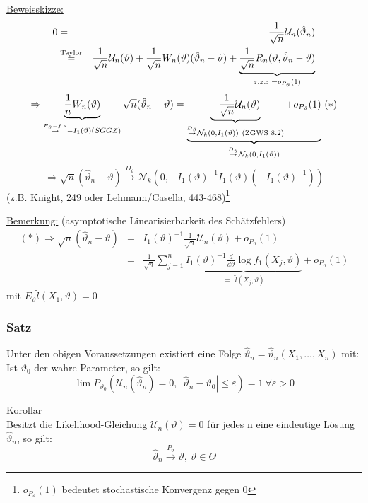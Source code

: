 \documentclass[a4paper,11pt,twoside,titlepage]{article}
\newcommand\NN{ \mathcal{N} } %
\newcommand\UU{ \mathcal{U} } %
\begin{document}
\underline{Beweisskizze:}
\begin{eqnarray*}0&=&\frac{1}{\sqrt{n}}\UU_n(\hat\vartheta_n)\\
&\stackrel{\textnormal{Taylor}}{=}&\frac{1}{\sqrt{n}}\UU_n(\vartheta)+\frac{1}{\sqrt{n}}W_n(\vartheta)(\hat\vartheta_n-\vartheta)+\underbrace{\frac{1}{\sqrt{n}}
R_n(\vartheta,\hat\vartheta_n-\vartheta)}_{z.z.:\ =o_{P_\vartheta}(1)}\\
\end{eqnarray*}
\[\Rightarrow\underbrace{\frac1nW_n(\vartheta)}_{\stackrel{P_\vartheta-f.s}{\rightarrow}-I_1(\vartheta)(SGGZ)}
\sqrt{n}(\hat\vartheta_n-\vartheta)=\underbrace{\underbrace{-\frac{1}{\sqrt{n}}\UU_n(\vartheta)}_{\stackrel{D_\vartheta}{\rightarrow}
\NN_k(0,I_1(\vartheta))\ \textnormal{(ZGWS 8.2)}}+o_{P_\vartheta}(1)}_{\stackrel{D_\vartheta}{\to}\NN_k(0,I_1(\vartheta))}\ (\ast)\]
$$\Rightarrow\sqrt{n}(\hat\vartheta_n-\vartheta)\stackrel{D_\vartheta}{\rightarrow}\NN_k(0,-I_1(\vartheta)^{-1}I_1(\vartheta)(-I_1(\vartheta)^{-1}))$$
(z.B. Knight, 249 oder Lehmann/Casella, 443-468)\footnote{$o_{P_\vartheta}(1)$ bedeutet stochastische Konvergenz gegen 0}

\underline{Bemerkung:} (asymptotische Linearisierbarkeit des Schätzfehlers)
\begin{eqnarray*}
(\ast)\Rightarrow\sqrt{n}(\hat\vartheta_n-\vartheta)&=&I_1(\vartheta)^{-1}\frac{1}{\sqrt{n}}\UU_n(\vartheta)+o_{P_\vartheta}(1)\\
&=&\frac{1}{\sqrt{n}}\sum_{j=1}^n\underbrace{I_1(\vartheta)^{-1}\frac{d}{d\vartheta}\log f_1(X_j,\vartheta)}_{
=:\widetilde{l}(X_j,\vartheta)}+o_{P_\vartheta}(1)
\end{eqnarray*}
mit $E_\vartheta\widetilde{l}(X_1,\vartheta)=0$

\subsubsection{Satz}
Unter den obigen Voraussetzungen existiert eine Folge $\hat\vartheta_n=\hat\vartheta_n(X_1,\ldots,X_n)$ mit:\\
Ist $\vartheta_0$ der wahre Parameter, so gilt:
$$\lim P_{\vartheta_0}(\UU_n(\hat\vartheta_n)=0,\ \left| \hat\vartheta_n-\vartheta_0\right|\leq \varepsilon)=1\ \forall\varepsilon>0$$

\underline{Korollar}\\
Besitzt die Likelihood-Gleichung $\UU_n(\vartheta)=0$ für jedes n eine eindeutige Lösung $\hat\vartheta_n$, so gilt:
$$\hat\vartheta_n\stackrel{P_\vartheta}{\rightarrow}\vartheta,\ \vartheta\in\Theta$$
\end{document}
